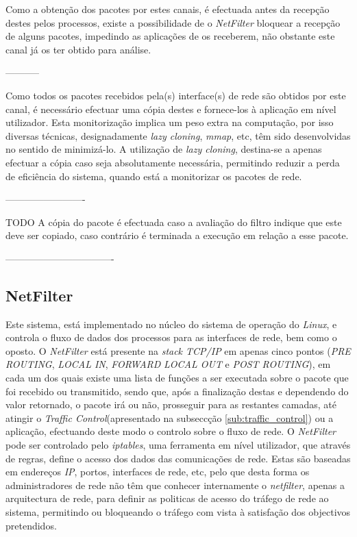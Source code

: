 Como a obtenção dos pacotes por estes canais, é efectuada antes da recepção destes pelos processos, existe a possibilidade de o \textit{NetFilter} bloquear a recepção de alguns pacotes, impedindo as aplicações de os receberem, não obstante este canal já os ter obtido para análise.

-----------

Como todos os pacotes recebidos pela(s) interface(s) de rede são obtidos por este canal, é necessário efectuar uma cópia destes e fornece-los à aplicação em nível utilizador.
Esta monitorização implica um peso extra na computação, por isso diversas técnicas, designadamente \textit{lazy cloning}, \textit{mmap}, etc, têm sido desenvolvidas no sentido de minimizá-lo.
A utilização de \textit{lazy cloning}, destina-se a apenas efectuar a cópia caso seja absolutamente necessária, permitindo reduzir a perda de eficiência do sistema, quando está a monitorizar os pacotes de rede.

-------------------------

TODO
A cópia do pacote é efectuada caso a avaliação do filtro indique que este deve ser copiado, caso contrário é terminada a execução em relação a esse pacote.

----------------------------------

\subsection{NetFilter}

Este sistema, está implementado no núcleo do sistema de operação do \textit{Linux}, e controla o fluxo de dados dos processos para as interfaces de rede, bem como o oposto.
O \textit{NetFilter} está presente na \textit{stack TCP/IP} em apenas cinco pontos (\textit{PRE ROUTING}, \textit{LOCAL IN}, \textit{FORWARD} \textit{LOCAL OUT} e \textit{POST ROUTING}), em cada um dos quais existe uma lista de funções a ser executada sobre o pacote que foi recebido ou transmitido, sendo que, após a finalização destas e dependendo do valor retornado, o pacote irá ou não, prosseguir para as restantes camadas, até atingir o \textit{Traffic Control}(apresentado na subseccção \ref{sub:traffic_control}) ou a aplicação, efectuando deste modo o controlo sobre o fluxo de rede.
O \textit{NetFilter} pode ser controlado pelo \textit{iptables}, uma ferramenta em nível utilizador, que através de regras, define o acesso dos dados das comunicações \color{red} de \color{black} rede.
Estas são baseadas em endereços \textit{IP}, portos, interfaces de rede, etc, pelo que desta forma os administradores de rede não têm que conhecer internamente o \textit{netfilter}, apenas a arquitectura de rede, para definir as politicas de acesso do tráfego de rede ao sistema, permitindo ou bloqueando o tráfego com vista à satisfação dos objectivos pretendidos. 

